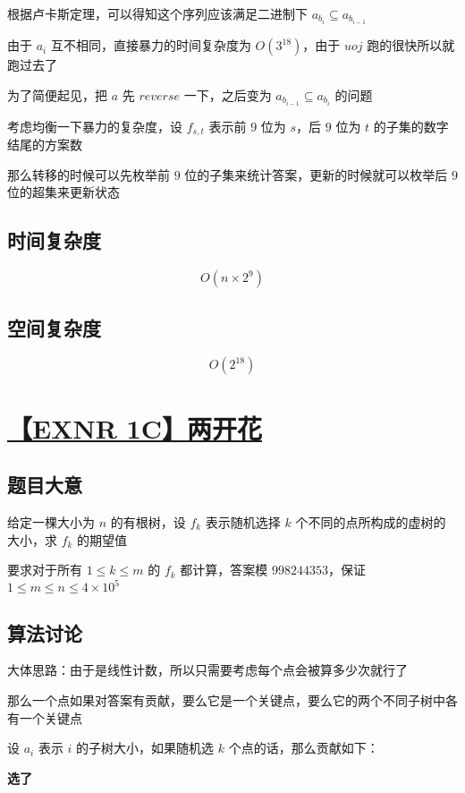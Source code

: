 \documentclass[UTF8]{article}
\begin{document}
根据卢卡斯定理，可以得知这个序列应该满足二进制下 $a_{b_i} \subseteq a_{b_{i-1}}$

由于 $a_i$ 互不相同，直接暴力的时间复杂度为 $O(3^{18})$，由于 $uoj$ 跑的很快所以就跑过去了

为了简便起见，把 $a$ 先 $reverse$ 一下，之后变为 $a_{b_{i-1}} \subseteq a_{b_i}$ 的问题

考虑均衡一下暴力的复杂度，设 $f_{s,t}$ 表示前 $9$ 位为 $s$，后 $9$ 位为 $t$ 的子集的数字结尾的方案数

那么转移的时候可以先枚举前 $9$ 位的子集来统计答案，更新的时候就可以枚举后 $9$ 位的超集来更新状态

\subsection{时间复杂度}

$$
O(n \times 2^9)
$$

\subsection{空间复杂度}

$$
O(2^{18})
$$

\section{\href{http://192.168.14.17/problem/629}{【EXNR 1C】两开花}}

\subsection{题目大意}

给定一棵大小为 $n$ 的有根树，设 $f_k$ 表示随机选择 $k$ 个不同的点所构成的虚树的大小，求 $f_k$ 的期望值

要求对于所有 $1 \le k \le m$ 的 $f_k$ 都计算，答案模 $998244353$，保证 $1 \le m \le n \le 4 \times 10^5$

\subsection{算法讨论}

大体思路：由于是线性计数，所以只需要考虑每个点会被算多少次就行了

那么一个点如果对答案有贡献，要么它是一个关键点，要么它的两个不同子树中各有一个关键点

设 $a_i$ 表示 $i$ 的子树大小，如果随机选 $k$ 个点的话，那么贡献如下：

\textbf{选了}
\end{document}
